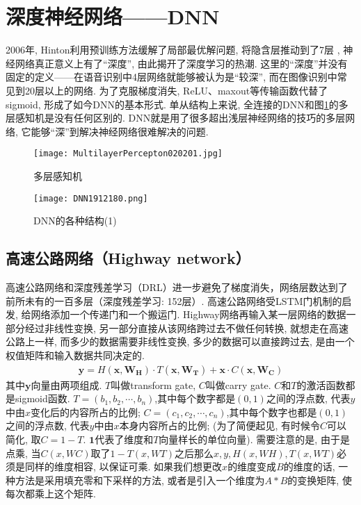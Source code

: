 \section{深度神经网络——DNN}
2006年, Hinton利用预训练方法缓解了局部最优解问题, 将隐含层推动到了7层 \cite{Hinton2006-9587}, 神经网络真正意义上有了“深度”, 由此揭开了深度学习的热潮. 这里的“深度”并没有固定的定义——在语音识别中4层网络就能够被认为是“较深”, 而在图像识别中常见到20层以上的网络. 为了克服梯度消失, ReLU、maxout等传输函数代替了sigmoid, 形成了如今DNN的基本形式. 单从结构上来说, 全连接的DNN和图\ref{MultilayerPercepton020201}的多层感知机是没有任何区别的. DNN就是用了很多超出浅层神经网络的技巧的多层网络, 它能够“深”到解决神经网络很难解决的问题.
\begin{figure}[H]
\centering
\texttt{[image: MultilayerPercepton020201.jpg]}
\caption{多层感知机}
\label{MultilayerPercepton020201}
\end{figure}

\begin{figure}[H]
\centering
\texttt{[image: DNN1912180.png]}
\caption{DNN的各种结构(1)}
\label{DNN191218121500010}
\end{figure}
\subsection{高速公路网络（Highway network）}
高速公路网络和深度残差学习（DRL）进一步避免了梯度消失，网络层数达到了前所未有的一百多层（深度残差学习: 152层）\cite{HeCVPR2016-9590, NIPS2015-5850}.
高速公路网络受LSTM门机制的启发, 给网络添加一个传递门和一个搬运门. Highway网络再输入某一层网络的数据一部分经过非线性变换, 另一部分直接从该网络跨过去不做任何转换, 就想走在高速公路上一样, 而多少的数据需要非线性变换, 多少的数据可以直接跨过去, 是由一个权值矩阵和输入数据共同决定的.
\begin{align}
\mathbf{y}=H\left(\mathbf{x}, \mathbf{W}_{\mathbf{H}}\right) \cdot T\left(\mathbf{x}, \mathbf{W}_{\mathbf{T}}\right)+\mathbf{x} \cdot C\left(\mathbf{x}, \mathbf{W}_{\mathbf{C}}\right)
\end{align}
其中$\bm y$向量由两项组成. $T$叫做transform gate, $C$叫做carry gate. $C$和$T$的激活函数都是sigmoid函数.
$T=(b_1, b_2, \cdots, b_n)$,其中每个数字都是$(0, 1)$之间的浮点数, 代表$y$中由$x$变化后的内容所占的比例;
$C=(c_1, c_2, \cdots, c_n)$,其中每个数字也都是$(0, 1)$之间的浮点数, 代表$y$中由$x$本身内容所占的比例;
(为了简便起见, 有时候令$C$可以简化, 取$C=1-T$. $\bm 1$代表了维度和$T$向量样长的单位向量).
需要注意的是, 由于是点乘, 当$C(x,WC)$取了$1-T(x,WT)$之后那么$x,y,H(x,WH),T(x,WT)$必须是同样的维度相容, 以保证可乘.
如果我们想更改$x$的维度变成$B$的维度的话, 一种方法是采用填充零和下采样的方法, 或者是引入一个维度为$A*B$的变换矩阵, 使每次都乘上这个矩阵.

